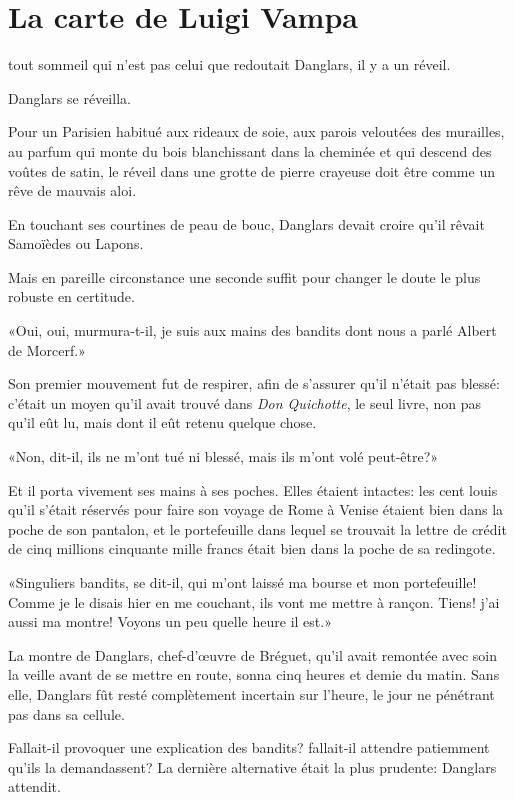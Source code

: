 \chapter{La carte de Luigi Vampa} 

\lettrine{}{} tout sommeil qui n'est pas celui que redoutait Danglars, il y a un réveil. 

\zz
Danglars se réveilla. 

\zz
Pour un Parisien habitué aux rideaux de soie, aux parois veloutées des murailles, au parfum qui monte du bois blanchissant dans la cheminée et qui descend des voûtes de satin, le réveil dans une grotte de pierre crayeuse doit être comme un rêve de mauvais aloi. 

En touchant ses courtines de peau de bouc, Danglars devait croire qu'il rêvait Samoïèdes ou Lapons. 

Mais en pareille circonstance une seconde suffit pour changer le doute le plus robuste en certitude. 

«Oui, oui, murmura-t-il, je suis aux mains des bandits dont nous a parlé Albert de Morcerf.» 

Son premier mouvement fut de respirer, afin de s'assurer qu'il n'était pas blessé: c'était un moyen qu'il avait trouvé dans \textit{Don Quichotte}, le seul livre, non pas qu'il eût lu, mais dont il eût retenu quelque chose. 

«Non, dit-il, ils ne m'ont tué ni blessé, mais ils m'ont volé peut-être?» 

Et il porta vivement ses mains à ses poches. Elles étaient intactes: les cent louis qu'il s'était réservés pour faire son voyage de Rome à Venise étaient bien dans la poche de son pantalon, et le portefeuille dans lequel se trouvait la lettre de crédit de cinq millions cinquante mille francs était bien dans la poche de sa redingote. 

«Singuliers bandits, se dit-il, qui m'ont laissé ma bourse et mon portefeuille! Comme je le disais hier en me couchant, ils vont me mettre à rançon. Tiens! j'ai aussi ma montre! Voyons un peu quelle heure il est.» 

La montre de Danglars, chef-d'œuvre de Bréguet, qu'il avait remontée avec soin la veille avant de se mettre en route, sonna cinq heures et demie du matin. Sans elle, Danglars fût resté complètement incertain sur l'heure, le jour ne pénétrant pas dans sa cellule. 

Fallait-il provoquer une explication des bandits? fallait-il attendre patiemment qu'ils la demandassent? La dernière alternative était la plus prudente: Danglars attendit. 

